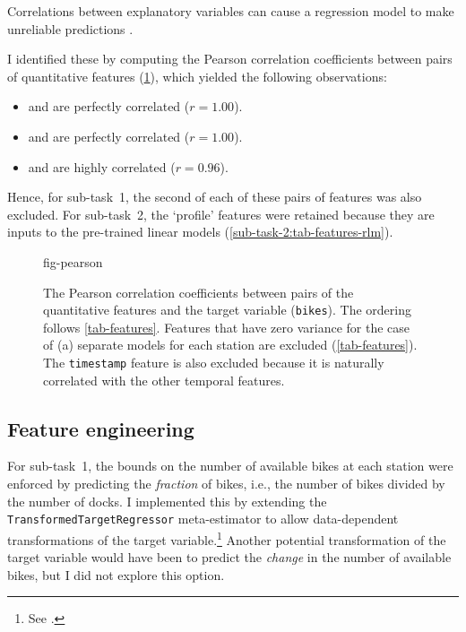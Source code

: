 Correlations between explanatory variables can cause a regression model to make
unreliable predictions \parencite{Alin2010}.
\begin{samepage}
  I identified these by computing the Pearson correlation
  coefficients between pairs of quantitative features (\cref{fig-pearson}), which
  yielded the following observations:
  \begin{itemize}
    \item \texttt{\bikesavgfull} and \texttt{\bikesavgshort} are perfectly correlated ($r = 1.00$).
    \item \texttt{\bikeshdiffavgfull} and \texttt{\bikeshdiffavgshort} are perfectly correlated ($r  = 1.00$).
    \item \texttt{\windspeedmax} and \texttt{\windspeedavg} are highly correlated ($r = 0.96$).
  \end{itemize}
\end{samepage}
Hence, for sub-task~1, the second of each of these pairs of features was also excluded.
For sub-task~2, the `profile' features were retained because they are inputs to the
pre-trained linear models (\cref{sub-task-2:tab-features-rlm}).

\begin{figure}
  \centering
  {fig-pearson}
  \caption{
    The Pearson correlation coefficients between pairs of the quantitative features and
    the target variable (\texttt{bikes}).
    The ordering follows \cref{tab-features}.
    Features that have zero variance for the case of (a) separate models for each station
    are excluded (\cref{tab-features}).
    The \texttt{timestamp} feature is also excluded because it is naturally correlated with
    the other temporal features.
  }
  \label{fig-pearson}
\end{figure}

\subsection{Feature engineering}
\label{sec:data-analysis:feature-engineering}

For sub-task~1, the bounds on the number of available bikes at each station were
enforced by predicting the \emph{fraction} of bikes, i.e., the number of bikes divided
by the number of docks.
I implemented this by extending the \texttt{TransformedTargetRegressor} meta-estimator
to allow data-dependent transformations of the target variable.\footnote{See
  .
}
Another potential transformation of the target variable would have been to predict the
\emph{change} in the number of available bikes, but I did not explore this option.

